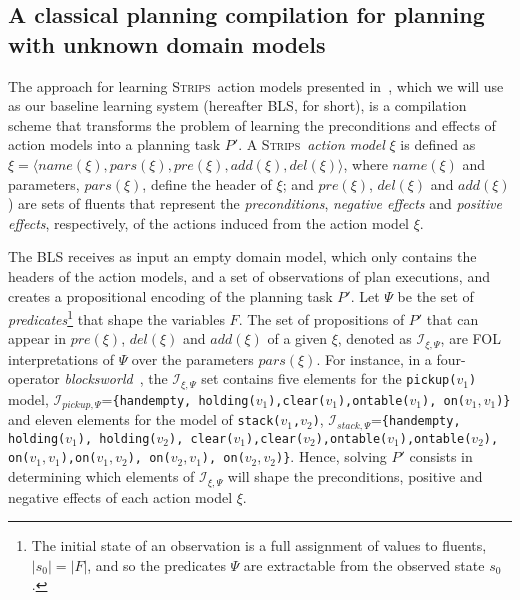 \documentclass[letterpaper]{article} %
\newcommand{\tup}[1]{{\langle #1 \rangle}}
\newcommand{\strips}{\textsc{Strips}}     %
\begin{document}
\subsection{A classical planning compilation for planning with unknown domain models}
The approach for learning \strips\ action models presented in~\cite{aineto2018learning}, which we will use as our baseline learning system (hereafter BLS, for short), is a compilation scheme that transforms the problem of learning the preconditions and effects of action models into a planning task $P'$. A \strips\ \emph{action model} $\xi$ is defined as $\xi=\tup{name(\xi),pars(\xi),pre(\xi),add(\xi),del(\xi)}$, where $name(\xi)$ and parameters, $pars(\xi)$, define the header of $\xi$; and $pre(\xi)$, $del(\xi)$ and $add(\xi)$) are sets of fluents that represent the {\em preconditions}, {\em negative effects} and {\em positive effects}, respectively, of the actions induced from the action model $\xi$.

The BLS receives as input an empty domain model, which only contains the headers of the action models, and a set of observations of plan executions, and creates a propositional encoding of the planning task $P'$. Let $\Psi$ be the set of {\em predicates}\footnote{The initial state of an observation is a full assignment of values to fluents, $|s_0|=|F|$, and so the predicates $\Psi$ are extractable from the observed state $s_0$.} that shape the variables $F$. The set of propositions of $P'$ that can appear in $pre(\xi)$, $del(\xi)$ and $add(\xi)$ of a given $\xi$, denoted as ${\mathcal I}_{\xi,\Psi}$, are FOL interpretations of $\Psi$ over the parameters $pars(\xi)$. For instance, in a four-operator {\em blocksworld}~\cite{slaney2001blocks}, the ${\mathcal I}_{\xi,\Psi}$ set contains five elements for the {\small \tt pickup($v_1$)} model, ${\mathcal I}_{pickup,\Psi}$={\small\tt\{handempty, holding($v_1$),clear($v_1$),ontable($v_1$), on($v_1,v_1$)\}} and eleven elements for the model of {\small \tt stack($v_1$,$v_2$)}, ${\mathcal I}_{stack,\Psi}$={\small\tt\{handempty, holding($v_1$), holding($v_2$), clear($v_1$),clear($v_2$),ontable($v_1$),ontable($v_2$), \\
on($v_1,v_1$),on($v_1,v_2$), on($v_2,v_1$), on($v_2,v_2$)\}}. Hence, solving $P'$ consists in determining which elements of ${\mathcal I}_{\xi,\Psi}$ will shape the preconditions, positive and negative effects of each action model $\xi$.
\end{document}
